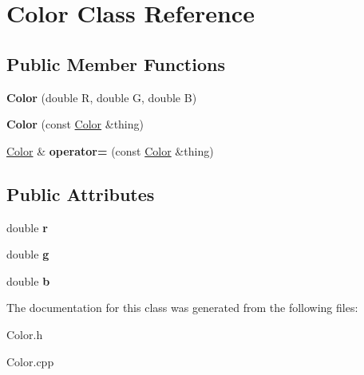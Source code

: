 \hypertarget{class_color}{}\section{Color Class Reference}
\label{class_color}
\subsection*{Public Member Functions}
\begin{DoxyCompactItemize}
\item 
\hypertarget{class_color_ae0541336b70cced03c2c45a3a2b7b354}{}\label{class_color_ae0541336b70cced03c2c45a3a2b7b354} 
{\bfseries Color} (double R, double G, double B)
\item 
\hypertarget{class_color_ab8a27fb7806f0463f81779a727b10d53}{}\label{class_color_ab8a27fb7806f0463f81779a727b10d53} 
{\bfseries Color} (const \hyperlink{class_color}{Color} \&thing)
\item 
\hypertarget{class_color_a279277fa3deb3c47ea73b87cbb284d30}{}\label{class_color_a279277fa3deb3c47ea73b87cbb284d30} 
\hyperlink{class_color}{Color} \& {\bfseries operator=} (const \hyperlink{class_color}{Color} \&thing)
\end{DoxyCompactItemize}
\subsection*{Public Attributes}
\begin{DoxyCompactItemize}
\item 
\hypertarget{class_color_a12b28b8a60c6add344b485d12e1d2168}{}\label{class_color_a12b28b8a60c6add344b485d12e1d2168} 
double {\bfseries r}
\item 
\hypertarget{class_color_adcc846eae0491cee6a64f503044bca1b}{}\label{class_color_adcc846eae0491cee6a64f503044bca1b} 
double {\bfseries g}
\item 
\hypertarget{class_color_a37683f9d882695ac49f945d52158055a}{}\label{class_color_a37683f9d882695ac49f945d52158055a} 
double {\bfseries b}
\end{DoxyCompactItemize}


The documentation for this class was generated from the following files\+:\begin{DoxyCompactItemize}
\item 
Color.\+h\item 
Color.\+cpp\end{DoxyCompactItemize}
